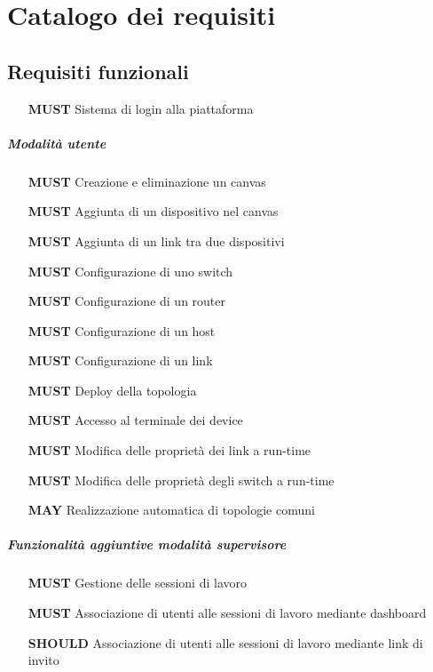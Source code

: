 \documentclass[../main.tex]{subfiles}
\begin{document}
\chapter{Catalogo dei requisiti}
\section{Requisiti funzionali}

\begin{itemize}
    \item[\textbf{MUST}] Sistema di login alla piattaforma
\end{itemize}
\paragraph{Modalità utente}
\begin{itemize}
    \item[\textbf{MUST}] Creazione e eliminazione un canvas
    \item[\textbf{MUST}] Aggiunta di un dispositivo nel canvas
    \item[\textbf{MUST}] Aggiunta di un link tra due dispositivi
    \item[\textbf{MUST}] Configurazione di uno switch
    \item[\textbf{MUST}] Configurazione di un router
    \item[\textbf{MUST}] Configurazione di un host
    \item[\textbf{MUST}] Configurazione di un link
    \item[\textbf{MUST}] Deploy della topologia
    \item[\textbf{MUST}] Accesso al terminale dei device
    \item[\textbf{MUST}] Modifica delle proprietà dei link a run-time
    \item[\textbf{MUST}] Modifica delle proprietà degli switch a run-time
    \item[\textbf{MAY}] Realizzazione automatica di topologie comuni    
\end{itemize}
\paragraph{Funzionalità aggiuntive modalità supervisore}
\begin{itemize}
    \item[\textbf{MUST}] Gestione delle sessioni di lavoro
    \item[\textbf{MUST}] Associazione di utenti alle sessioni di lavoro mediante dashboard
    \item[\textbf{SHOULD}] Associazione di utenti alle sessioni di lavoro mediante link di invito
\end{itemize}
\end{document}
